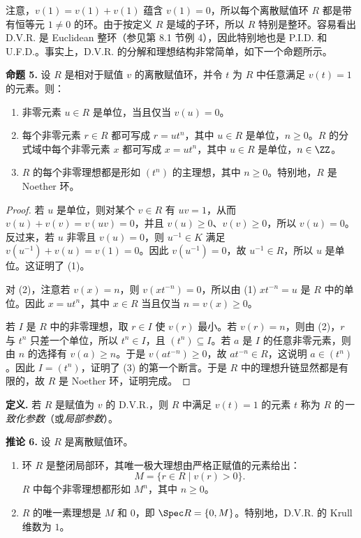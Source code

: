 注意，$v(1)=v(1)+v(1)$ 蕴含 $v(1)=0$，所以每个离散赋值环 $R$ 都是带有恒等元 $1\neq0$ 的环。由于按定义 $R$ 是域的子环，所以 $R$ 特别是整环。容易看出 D.V.R. 是 Euclidean 整环（参见第 8.1 节例 4），因此特别地也是 P.I.D. 和 U.F.D.。事实上，D.V.R. 的分解和理想结构非常简单，如下一个命题所示。

\medskip
\noindent\textbf{命题 5.} 设 $R$ 是相对于赋值 $v$ 的离散赋值环，并令 $t$ 为 $R$ 中任意满足 $v(t)=1$ 的元素。则：
\begin{enumerate}[label=(\arabic*)]
  \item 非零元素 $u\in R$ 是单位，当且仅当 $v(u)=0$。
  \item 每个非零元素 $r\in R$ 都可写成 $r=ut^n$，其中 $u\in R$ 是单位，$n\geq0$。$R$ 的分式域中每个非零元素 $x$ 都可写成 $x=ut^n$，其中 $u\in R$ 是单位，$n\in\ZZ$。
  \item $R$ 的每个非零理想都是形如 $(t^n)$ 的主理想，其中 $n\geq0$。特别地，$R$ 是 Noether 环。
\end{enumerate}

\begin{proof}
若 $u$ 是单位，则对某个 $v\in R$ 有 $uv=1$，从而 $v(u)+v(v)=v(uv)=0$，并且 $v(u)\geq0$、$v(v)\geq0$，所以 $v(u)=0$。反过来，若 $u$ 非零且 $v(u)=0$，则 $u^{-1}\in K$ 满足 $v(u^{-1})+v(u)=v(1)=0$。因此 $v(u^{-1})=0$，故 $u^{-1}\in R$，所以 $u$ 是单位。这证明了 (1)。

对 (2)，注意若 $v(x)=n$，则 $v(xt^{-n})=0$，所以由 (1) $xt^{-n}=u$ 是 $R$ 中的单位。因此 $x=ut^n$，其中 $x\in R$ 当且仅当 $n=v(x)\geq0$。

若 $I$ 是 $R$ 中的非零理想，取 $r\in I$ 使 $v(r)$ 最小。若 $v(r)=n$，则由 (2)，$r$ 与 $t^n$ 只差一个单位，所以 $t^n\in I$，且 $(t^n)\subseteq I$。若 $a$ 是 $I$ 的任意非零元素，则由 $n$ 的选择有 $v(a)\geq n$。于是 $v(at^{-n})\geq0$，故 $at^{-n}\in R$，这说明 $a\in(t^n)$。因此 $I=(t^n)$，证明了 (3) 的第一个断言。于是 $R$ 中的理想升链显然都是有限的，故 $R$ 是 Noether 环，证明完成。
\end{proof}

\noindent\textbf{定义.} 若 $R$ 是赋值为 $v$ 的 D.V.R.，则 $R$ 中满足 $v(t)=1$ 的元素 $t$ 称为 $R$ 的\emph{一致化参数}（或\emph{局部参数}）。

\medskip
\noindent\textbf{推论 6.} 设 $R$ 是离散赋值环。
\begin{enumerate}[label=(\arabic*)]
  \item 环 $R$ 是整闭局部环，其唯一极大理想由严格正赋值的元素给出：
  \[
    M=\{r\in R\mid v(r)>0\}.
  \]
  $R$ 中每个非零理想都形如 $M^n$，其中 $n\geq0$。
  \item $R$ 的唯一素理想是 $M$ 和 $0$，即 $\Spec R=\{0,M\}$。特别地，D.V.R. 的 Krull 维数为 $1$。
\end{enumerate}


